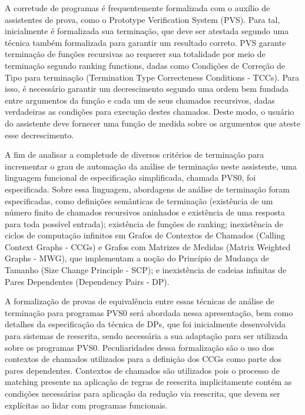 A corretude de programas é frequentemente formalizada com o auxílio de assistentes de prova, como o Prototype Verification System (PVS). Para tal, inicialmente é formalizada  sua terminação, que deve ser atestada segundo uma técnica também formalizada para garantir um resultado correto. PVS garante terminação de funções recursivas ao requerer sua totalidade por meio de terminação segundo ranking functions, dadas como Condições de Correção de Tipo para terminação (Termination Type Correcteness Conditions - TCCs). Para isso, é necessário garantir um decrescimento segundo uma ordem bem fundada entre argumentos da função e cada um de seus chamados recursivos, dadas verdadeiras as condições para execução destes chamados. Deste modo, o usuário do assistente deve fornecer uma função de medida sobre os argumentos que ateste esse decrescimento.

A fim de analisar a completude de diversos critérios de terminação para incrementar o grau de automação da análise de terminação neste assistente, uma linguagem funcional de especificação simplificada, chamada PVS0, foi especificada. Sobre essa linguagem, abordagens de análise de terminação foram especificadas, como definições semânticas de terminação (existência de um número finito de chamados recursivos aninhados e existência de uma resposta para toda possível entrada); existência de funções de ranking; inexistência de ciclos de computação infinitos em Grafos de Contextos de Chamados (Calling Context Graphs - CCGs) e Grafos com Matrizes de Medidas (Matrix Weighted Graphs - MWG), que implementam a noção do Princípio de Mudança de Tamanho (Size Change Principle - SCP); e inexistência de cadeias infinitas de Pares Dependentes (Dependency Pairs - DP).

A formalização de provas de equivalência entre essas técnicas de análise de terminação para programas PVS0 será abordada nessa apresentação, bem como detalhes da especificação da técnica de DPs, que foi inicialmente desenvolvida para sistemas de reescrita, sendo necessária a sua adaptação para ser utilizada sobre os programas PVS0. Peculiaridades dessa formalização são o uso dos contextos de chamados utilizados para a definição dos CCGs como parte dos pares dependentes. Contextos de chamados são utilizados pois o processo de matching presente na aplicação de regras de reescrita implicitamente contém as condições necessárias para aplicação da redução via reescrita, que devem ser explícitas ao lidar com programas funcionais.

